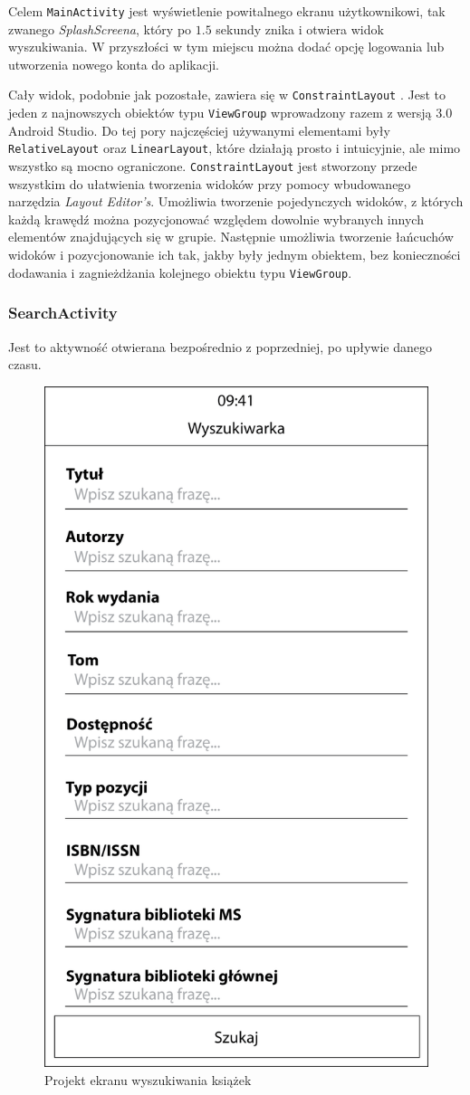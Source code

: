 \documentclass[twoside]{projektInzynierskiMS}
\begin{document}
Celem \verb`MainActivity` jest wyświetlenie powitalnego ekranu użytkownikowi, tak zwanego \textit{SplashScreena}, który po $1.5$ sekundy znika i otwiera widok wyszukiwania. W przyszłości w tym miejscu można dodać opcję logowania lub utworzenia nowego konta do aplikacji.

Cały widok, podobnie jak pozostałe, zawiera się w \verb`ConstraintLayout` \cite{constraintLayout}. Jest to jeden z najnowszych obiektów typu \verb`ViewGroup` wprowadzony razem z wersją $3.0$ Android Studio. Do tej pory najczęściej używanymi elementami były \verb`RelativeLayout` oraz \verb`LinearLayout`, które działają prosto i intuicyjnie, ale mimo wszystko są mocno ograniczone. \verb`ConstraintLayout` jest stworzony przede wszystkim do ułatwienia tworzenia widoków przy pomocy wbudowanego narzędzia \textit{Layout Editor's}. Umożliwia tworzenie pojedynczych widoków, z których każdą krawędź można pozycjonować względem dowolnie wybranych innych elementów znajdujących się w grupie. Następnie umożliwia tworzenie łańcuchów widoków i pozycjonowanie ich tak, jakby były jednym obiektem, bez konieczności dodawania i zagnieżdżania kolejnego obiektu typu \verb`ViewGroup`. 

\subsubsection{SearchActivity}

Jest to aktywność otwierana bezpośrednio z poprzedniej, po upływie danego czasu. 

\begin{figure}[h]
  \centering
  \includegraphics[width=0.4\linewidth]{img/SearchProject.png}
  \caption{Projekt ekranu wyszukiwania książek}
  \label{fig:androidSearch}
\end{figure}
\end{document}
